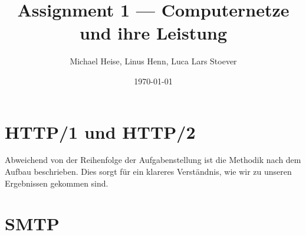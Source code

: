 \documentclass{article}
\title{Assignment 1 --- Computernetze und ihre Leistung}
\author{Michael Heise, Linus Henn, Luca Lars Stoever}
\date{\today}
\begin{document}


\begin{titlepage}

\end{titlepage}

\newpage

\renewcommand*\contentsname{Contents / Inhaltsverzeichnis}
\tableofcontents
\thispagestyle{empty}

\newpage

\setcounter{page}{1}
\section{HTTP/1 und HTTP/2}

Abweichend von der Reihenfolge der Aufgabenstellung ist die Methodik nach dem Aufbau beschrieben. Dies sorgt für ein klareres Verständnis, wie wir zu unseren Ergebnissen gekommen sind.















\newpage

\section{SMTP}


\newpage
\thispagestyle{empty}



\end{document}
